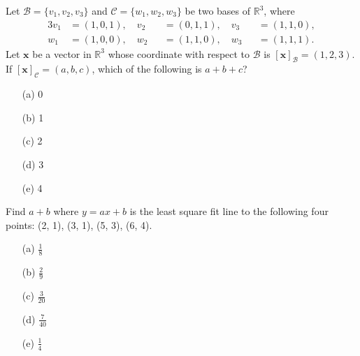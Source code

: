 \documentclass[a4paper,10pt]{article}
\makeatletter
\newlength{\Problen}
\newlength{\Probheadlen}
\newlength{\Probskip}
\newenvironment{ProbK}{\begin{lrbox}{\@syntest}%
    \begin{minipage}\textwidth}{\end{minipage}\end{lrbox}}
\newenvironment{ProbK}[2][]{ %
    \global\setbox\@lastproblem=\vbox\bgroup
    \par\noindent\parbox[t]{\Probheadlen}{\raggedleft\fontsize{10}{10pt}\selectfont
    {\bfseries\large #2 }\\[-1.5mm]
    \rule[1mm]{16mm}{.2mm}\\[-2mm]{\sffamily #1}}\hspace{\Probskip}%
    \begin{minipage}[t]{\Problen}}{\end{minipage}\par\vspace{3mm}\egroup%
    \unvcopy\@lastproblem}
\theoremstyle{remark}
\makeatother
\begin{document}
\vfill \eject

\begin{ProbK}[pt 10]{6}
Let $\mathcal{B} = \{v_1, v_2, v_3\}$ and $\mathcal{C} = \{w_1, w_2, w_3\}$ be 
two bases of $\mathbb{R}^3$, where 
\begin{alignat*}{3}
	v_1 &= (1, 0, 1),\quad v_2 &&= (0,1,1),\quad v_3 &&=(1,1,0),\\
	w_1 &= (1,0,0),\quad w_2 &&= (1,1,0),\quad w_3 &&=(1,1,1).
\end{alignat*}
Let $\mathbf{x}$ be a vector in $\mathbb{R}^3$ whose coordinate with respect to $\mathcal{B}$ is 
$[\mathbf{x}]_\mathcal{B} = (1, 2, 3)$. If $[\mathbf{x}]_\mathcal{C} = (a, b, c)$, which of the following is $a+b+c$?
\begin{enumerate}
	\item[(a)] 0
	\item[(b)] 1
	\item[(c)] 2
	\item[(d)] 3
	\item[(e)] 4
\end{enumerate}
\end{ProbK}

\vskip2cm

\begin{ProbK}[pt 10]{7}
Find $a+b$ where $y = ax+b$ is the least square fit line to the following four points: 
(2, 1), (3, 1), (5, 3), (6, 4).
    \begin{enumerate}
    \item[(a)] $\frac{1}{8}$
    \item[(b)] $\frac{2}{9}$
    \item[(c)] $\frac{3}{20}$
    \item[(d)] $\frac{7}{40}$
    \item[(e)] $\frac{1}{4}$
    \end{enumerate}
\end{ProbK}

\vfill \eject
\end{document}
